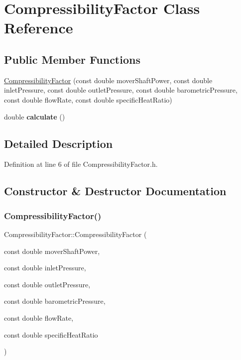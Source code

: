 \hypertarget{class_compressibility_factor}{}\section{Compressibility\+Factor Class Reference}
\label{class_compressibility_factor}
\subsection*{Public Member Functions}
\begin{DoxyCompactItemize}
\item 
\hyperlink{class_compressibility_factor_afb938d7e72ff7bcf5e979dd51f33e6b8}{Compressibility\+Factor} (const double mover\+Shaft\+Power, const double inlet\+Pressure, const double outlet\+Pressure, const double barometric\+Pressure, const double flow\+Rate, const double specific\+Heat\+Ratio)
\item 
\mbox{\label{class_compressibility_factor_a8bba71f8954f79d3eb704c7ee58a5f47}} 
double {\bfseries calculate} ()
\end{DoxyCompactItemize}


\subsection{Detailed Description}


Definition at line 6 of file Compressibility\+Factor.\+h.



\subsection{Constructor \& Destructor Documentation}
\mbox{\label{class_compressibility_factor_afb938d7e72ff7bcf5e979dd51f33e6b8}} 
\subsubsection{\texorpdfstring{Compressibility\+Factor()}{CompressibilityFactor()}}
{\footnotesize\ttfamily Compressibility\+Factor\+::\+Compressibility\+Factor (\begin{DoxyParamCaption}\item[{const double}]{mover\+Shaft\+Power,  }\item[{const double}]{inlet\+Pressure,  }\item[{const double}]{outlet\+Pressure,  }\item[{const double}]{barometric\+Pressure,  }\item[{const double}]{flow\+Rate,  }\item[{const double}]{specific\+Heat\+Ratio }\end{DoxyParamCaption})\hspace{0.3cm}{\ttfamily [inline]}}

